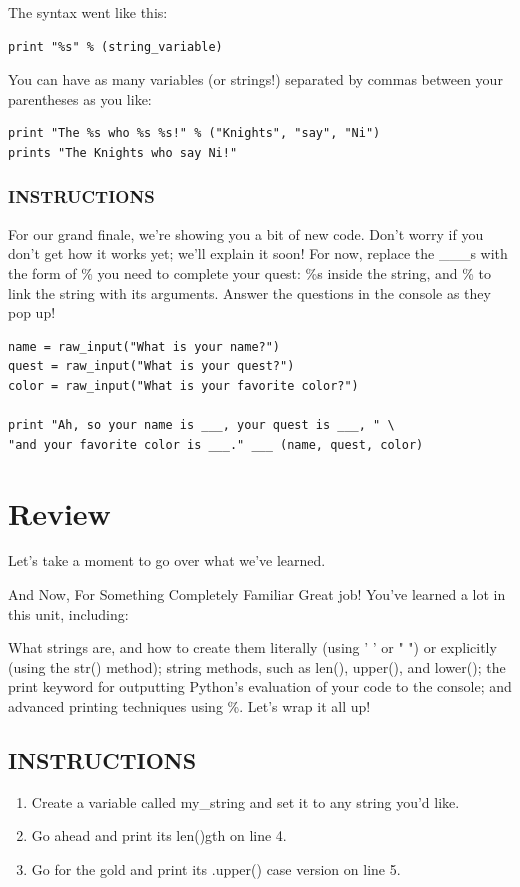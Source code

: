 \documentclass[12pt,a4paper,final,twoside,onecolumn,titlepage]{book}
\begin{document}
The syntax went like this:
\begin{lstlisting}
print "%s" % (string_variable)
\end{lstlisting}
You can have as many variables (or strings!) separated by commas between your parentheses as you like:
\begin{lstlisting}
print "The %s who %s %s!" % ("Knights", "say", "Ni")
prints "The Knights who say Ni!"
\end{lstlisting}

\subsubsection{INSTRUCTIONS}
For our grand finale, we're showing you a bit of new code. Don't worry if you don't get how it works yet; we'll explain it soon!
For now, replace the \_\_\_s with the form of \% you need to complete your quest: \%s inside the string, and \% to link the string with its arguments. Answer the questions in the console as they pop up!

\begin{lstlisting}
name = raw_input("What is your name?")
quest = raw_input("What is your quest?")
color = raw_input("What is your favorite color?")

print "Ah, so your name is ___, your quest is ___, " \
"and your favorite color is ___." ___ (name, quest, color)
\end{lstlisting}

\section{Review}
Let's take a moment to go over what we've learned.

And Now, For Something Completely Familiar
Great job! You've learned a lot in this unit, including:

What strings are, and how to create them literally (using ' ' or " ") or explicitly (using the str() method);
string methods, such as len(), upper(), and lower();
the print keyword for outputting Python's evaluation of your code to the console; and
advanced printing techniques using \%.
Let's wrap it all up!

\subsection{INSTRUCTIONS}
\begin{enumerate}
\item Create a variable called my\_string and set it to any string you'd like.
\item Go ahead and print its len()gth on line 4.
\item Go for the gold and print its .upper() case version on line 5.
\end{enumerate}
\end{document}
